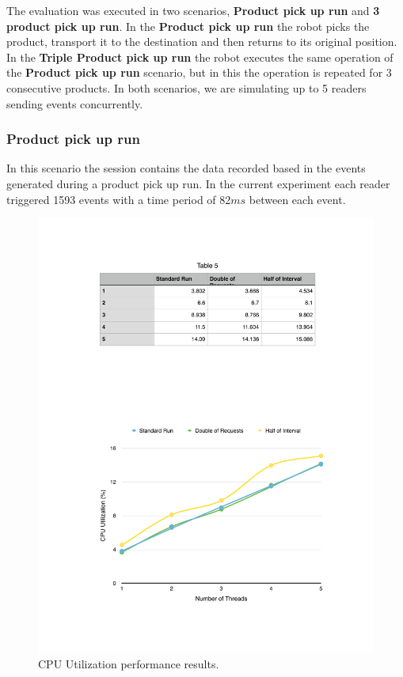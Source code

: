         The evaluation was executed in two scenarios, \textbf{Product pick up run} and \textbf{3 product pick up run}.
        In the \textbf{Product pick up run} the robot picks the product, transport it to the destination
        and then returns to its original position. In the \textbf{Triple Product pick up run} the robot executes
        the same operation of the \textbf{Product pick up run} scenario, but in this the operation is repeated
        for 3 consecutive products. In both scenarios, we are simulating up to 5 readers sending events
        concurrently.

        \subsubsection{Product pick up run}
        \label{subs:eval_exp_data_baseline}
        In this scenario the session contains the data recorded based in the events generated during a product
        pick up run. In the current experiment each reader triggered 1593 events with a time period of 82$ms$
        between each event.\\

        \begin{figure}[ht!]
          \centering
          \includegraphics[width=.7\textwidth]{./images/cpu_1_lap}
          \caption{CPU Utilization performance results.}
          \label{fig:eval_baseline_cpu}
        \end{figure}

